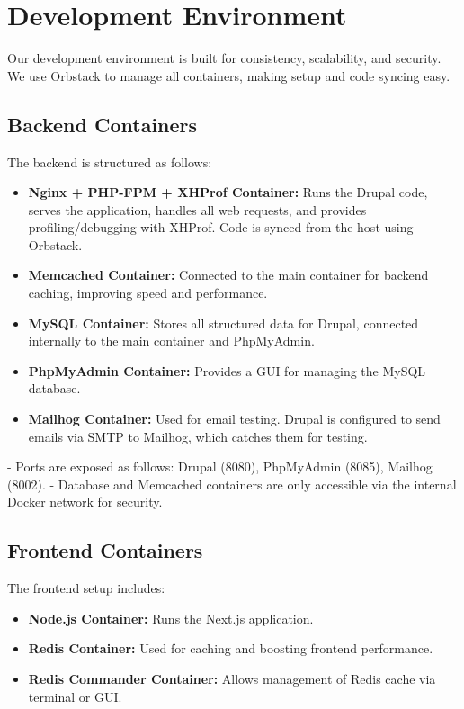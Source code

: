 \section{Development Environment}

Our development environment is built for consistency, scalability, and security. We use Orbstack to manage all containers, making setup and code syncing easy.

\subsection{Backend Containers}
The backend is structured as follows:
\begin{itemize}
    \item \textbf{Nginx + PHP-FPM + XHProf Container:} Runs the Drupal code, serves the application, handles all web requests, and provides profiling/debugging with XHProf. Code is synced from the host using Orbstack.
    \item \textbf{Memcached Container:} Connected to the main container for backend caching, improving speed and performance.
    \item \textbf{MySQL Container:} Stores all structured data for Drupal, connected internally to the main container and PhpMyAdmin.
    \item \textbf{PhpMyAdmin Container:} Provides a GUI for managing the MySQL database.
    \item \textbf{Mailhog Container:} Used for email testing. Drupal is configured to send emails via SMTP to Mailhog, which catches them for testing.
\end{itemize}

- Ports are exposed as follows: Drupal (8080), PhpMyAdmin (8085), Mailhog (8002).
- Database and Memcached containers are only accessible via the internal Docker network for security.

\subsection{Frontend Containers}
The frontend setup includes:
\begin{itemize}
    \item \textbf{Node.js Container:} Runs the Next.js application.
    \item \textbf{Redis Container:} Used for caching and boosting frontend performance.
    \item \textbf{Redis Commander Container:} Allows management of Redis cache via terminal or GUI.
\end{itemize}


